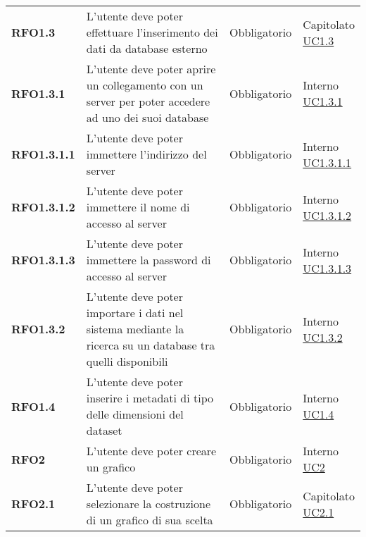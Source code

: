\begin{longtable}[H]{| >{\raggedright\bfseries}m{20mm} | >{\raggedright}m{90mm} | >{\centering}m{25mm} | >{\centering\arraybackslash}m{30mm}|}
    RFO1.3
    & L'utente deve poter effettuare l'inserimento dei dati da database esterno
    & Obbligatorio
    & \makecell{
        Capitolato \\
        \hyperref[ssub:uc1.3]{UC1.3}} \\

    RFO1.3.1
    &   L'utente deve poter aprire un collegamento con un server per poter
        accedere ad uno dei suoi database
    & Obbligatorio
    & \makecell{ Interno \\  \hyperref[par:uc1.3.1]{UC1.3.1}}\\

    RFO1.3.1.1
    &   L'utente deve poter immettere l'indirizzo del server
    & Obbligatorio
    & \makecell{ Interno \\  \hyperref[spar:uc1.3.1.1]{UC1.3.1.1}}\\

    RFO1.3.1.2
    &   L'utente deve poter immettere il nome di accesso al server
    & Obbligatorio
    & \makecell{ Interno \\  \hyperref[spar:uc1.3.1.2]{UC1.3.1.2}}\\

    RFO1.3.1.3
    &   L'utente deve poter immettere la password di accesso al server
    & Obbligatorio
    & \makecell{ Interno \\  \hyperref[spar:uc1.3.1.3]{UC1.3.1.3}}\\

    RFO1.3.2
    &   L'utente deve poter importare i dati nel sistema mediante la ricerca
        su un database tra quelli disponibili
    & Obbligatorio
    & \makecell{ Interno \\ \hyperref[par:uc1.3.2]{UC1.3.2}}\\

    RFO1.4
    &   L'utente deve poter inserire i metadati di tipo delle dimensioni del dataset
    & Obbligatorio
    & \makecell{ Interno \\ \hyperref[ssub:uc1.4]{UC1.4}}\\

    RFO2
    &  L'utente deve poter creare un grafico
    & Obbligatorio
    & \makecell{ Interno \\ \hyperref[sub:uc2]{UC2}}\\

    RFO2.1
    & L'utente deve poter selezionare la costruzione di un grafico di sua scelta
    & Obbligatorio
    & \makecell{ Capitolato \\ \hyperref[ssub:uc2.1]{UC2.1}}\\


\end{longtable}
